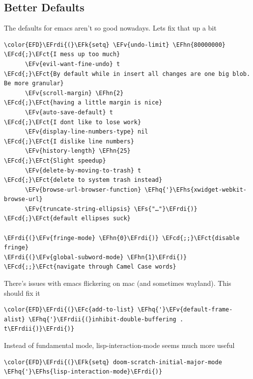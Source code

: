 \documentclass{scrartcl}
\newcommand{\EFk}[1]{\textcolor{EFk}{#1}} %
\newcommand{\EFs}[1]{\textcolor{EFs}{#1}} %
\newcommand{\EFct}[1]{\textcolor{EFct}{#1}} %
\newcommand{\EFc}[1]{\textcolor{EFc}{#1}} %
\newcommand{\EFv}[1]{\textcolor{EFv}{#1}} %
\newcommand{\EFcd}[1]{\textcolor{EFcd}{#1}} %
\newcommand{\EFhn}[1]{\textcolor{EFhn}{\textbf{#1}}} %
\newcommand{\EFhq}[1]{\textcolor{EFhq}{#1}} %
\newcommand{\EFhs}[1]{\textcolor{EFhs}{#1}} %
\newcommand{\EFrdi}[1]{\textcolor{EFrdi}{#1}} %
\newcommand{\EFrdii}[1]{\textcolor{EFrdii}{#1}} %
\begin{document}
\subsection{Better Defaults}
\label{sec:orga54e6a1}
The defaults for emacs aren't so good nowadays. Lets fix that up a bit
\begin{Code}
\begin{Verbatim}[]
\color{EFD}\EFrdi{(}\EFk{setq} \EFv{undo-limit} \EFhn{80000000}                          \EFcd{;}\EFct{I mess up too much}
      \EFv{evil-want-fine-undo} t                        \EFcd{;}\EFct{By default while in insert all changes are one big blob. Be more granular}
      \EFv{scroll-margin} \EFhn{2}                              \EFcd{;}\EFct{having a little margin is nice}
      \EFv{auto-save-default} t                          \EFcd{;}\EFct{I dont like to lose work}
      \EFv{display-line-numbers-type} nil                \EFcd{;}\EFct{I dislike line numbers}
      \EFv{history-length} \EFhn{25}                            \EFcd{;}\EFct{Slight speedup}
      \EFv{delete-by-moving-to-trash} t                  \EFcd{;}\EFct{delete to system trash instead}
      \EFv{browse-url-browser-function} \EFhq{'}\EFhs{xwidget-webkit-browse-url}
      \EFv{truncate-string-ellipsis} \EFs{"…"}\EFrdi{)}                \EFcd{;}\EFct{default ellipses suck}

\EFrdi{(}\EFv{fringe-mode} \EFhn{0}\EFrdi{)} \EFcd{;;}\EFct{disable fringe}
\EFrdi{(}\EFv{global-subword-mode} \EFhn{1}\EFrdi{)} \EFcd{;;}\EFct{navigate through Camel Case words}
\end{Verbatim}
\end{Code}

There's issues with emacs flickering on mac (and sometimes wayland). This should
fix it
\begin{Code}
\begin{Verbatim}[]
\color{EFD}\EFrdi{(}\EFc{add-to-list} \EFhq{'}\EFv{default-frame-alist} \EFhq{'}\EFrdii{(}inhibit-double-buffering . t\EFrdii{)}\EFrdi{)}
\end{Verbatim}
\end{Code}

Instead of fundamental mode, lisp-interaction-mode seems much more useful
\begin{Code}
\begin{Verbatim}[]
\color{EFD}\EFrdi{(}\EFk{setq} doom-scratch-initial-major-mode \EFhq{'}\EFhs{lisp-interaction-mode}\EFrdi{)}
\end{Verbatim}
\end{Code}
\end{document}
